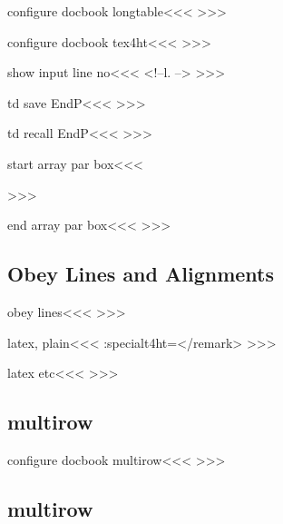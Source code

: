 \<configure docbook longtable\><<<
\def\r:HA{\HCode{</row>}}
\def\d:HA{\ifvmode \IgnorePar \fi \EndP\HCode{</entry>}|<td recall EndP|>}
>>>


\<configure docbook tex4ht\><<<
\newif\ifHCond
>>>


\<show input line no\><<<
<!--l. \the{}-->%
>>>


\<td save EndP\><<<
\SaveEndP 
>>>

\<td recall EndP\><<<
\RecallEndP 
>>>

\<start array par box\><<<
\par  \ShowPar
>>>

\<end array par box\><<<
\IgnorePar \EndP
>>>








\subsection{Obey Lines and Alignments}




\<obey lines\><<<
>>>

\<latex, plain\><<<
   {\ifvmode \IgnorePar \EndP
       \gdef\ob:ln{blockquote}%
    \else {}%
       \gdef\ob:ln{remark}%
    \fi
   }
   {\ht:special{t4ht=</\ob:ln>}\ShowPar} {\hbox{}}
>>>

\<latex etc\><<<
   {} {\ShowPar} {}{}
   {\ifvmode \IgnorePar\fi{}}
   {}
   {\ifvmode \IgnorePar\fi{}}
   {}
   {\ifvmode \IgnorePar\fi{}}
   {}
>>>


\subsection{multirow}

\<configure docbook multirow\><<<
    {}
    {}
>>>



\subsection{multirow}

